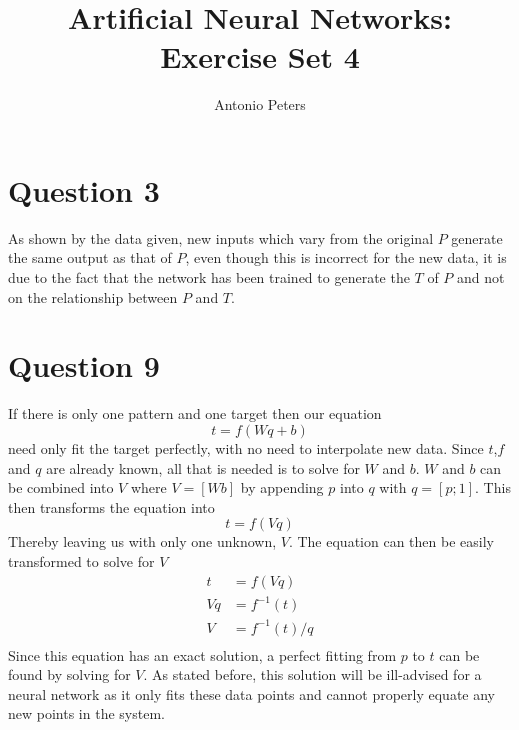 \documentclass[a4paper,10pt]{article}
\title{Artificial Neural Networks:\\ Exercise Set 4}
\author{Antonio Peters}
\begin{document}
\maketitle

\section{Question 3}
As shown by the data given, new inputs which vary from the original $P$ generate the same output as that of $P$, even though this is incorrect for the new data, it is due to the fact that the network has been trained to generate the $T$ of $P$ and not on the relationship between $P$ and $T$.

\section{Question 9}
If there is only one pattern and one target then our equation
\begin{equation}
 t = f(Wq+b)
\end{equation}
need only fit the target perfectly, with no need to interpolate new data. Since $t$,$f$ and $q$ are already known, all that is needed is to solve for $W$ and $b$. $W$ and $b$ can be combined into $V$ where $V=[W b]$ by appending $p$ into $q$ with $q=[p;1]$. This then transforms the equation into 
\begin{equation}
 t = f(Vq)
\end{equation}
Thereby leaving us with only one unknown, $V$. The equation can then be easily transformed to solve for $V$
\begin{equation}
\begin{align}
 t &= f(Vq)\\
 Vq &= f^{-1}(t)\\
 V &= f^{-1}(t)/q\\
\end{align}
\end{equation}
Since this equation has an exact solution, a perfect fitting from $p$ to $t$ can be found by solving for $V$. As stated before, this solution will be ill-advised for a neural network as it only fits these data points and cannot properly equate any new points in the system.
\end{document}
